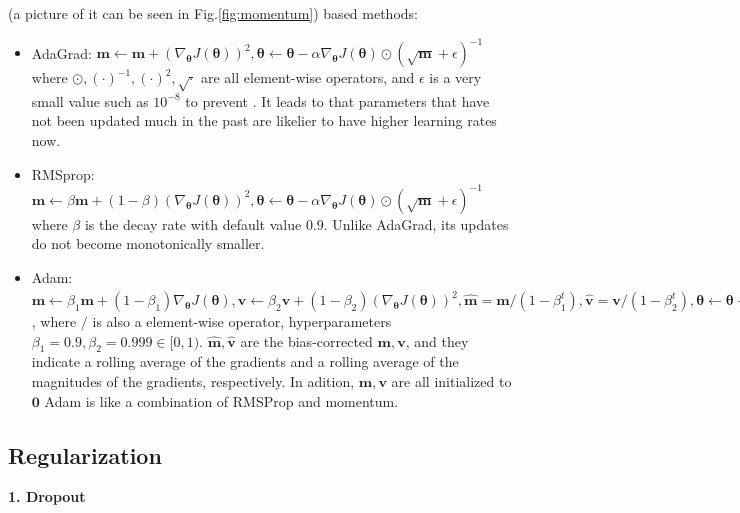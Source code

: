  (a picture of it can be seen in Fig.\ref{fig:momentum}) based methods:
\begin{itemize}
	\item AdaGrad: $\bm{m} \leftarrow \bm{m} + \left(\nabla_{\bm{\theta}} J (\bm{\theta})\right)^2, \bm{\theta} \leftarrow \bm{\theta} - \alpha \nabla_{\bm{\theta}} J (\bm{\theta}) \odot \left(\sqrt{\bm{m}} + \epsilon\right)^{-1}$ where $\odot, (\cdot)^{-1}, (\cdot)^{2}, \sqrt{\cdot}$ are all element-wise operators, and $\epsilon$ is a very small value such as $10^{-8}$ to prevent .
	It leads to that parameters that have not been updated much in the past are likelier to have higher learning rates now.
	\item RMSprop: $\bm{m} \leftarrow \beta \bm{m} + (1-\beta) \left(\nabla_{\bm{\theta}} J (\bm{\theta})\right)^2, \bm{\theta} \leftarrow \bm{\theta} - \alpha \nabla_{\bm{\theta}} J (\bm{\theta}) \odot \left(\sqrt{\bm{m}} + \epsilon\right)^{-1}$ where $\beta$ is the decay rate with default value $0.9$. Unlike AdaGrad, its updates do not become monotonically smaller.
	\item Adam: $\bm{m} \leftarrow \beta_1 \bm{m} + (1-\beta_1) \nabla_{\bm{\theta}} J (\bm{\theta}), \bm{v} \leftarrow \beta_2 \bm{v} + (1-\beta_2) \left(\nabla_{\bm{\theta}} J (\bm{\theta})\right)^2, \hat{\bm{m}} = \bm{m} / (1 - \beta_1^t), \hat{\bm{v}} = \bm{v} / (1 - \beta_2^t), \bm{\theta} \leftarrow \bm{\theta} - \alpha \hat{\bm{m}} /  \left(\sqrt{\hat{\bm{v}}} + \epsilon\right)^{-1}$, where $/$ is also a element-wise operator, hyperparameters $\beta_1 = 0.9, \beta_2 = 0.999 \in [0, 1)$. $\hat{\bm{m}}, \hat{\bm{v}}$ are the bias-corrected $\bm{m}, \bm{v}$, and they indicate a rolling average
	of the gradients and a rolling average of the magnitudes of the gradients, respectively. In adition, $\bm{m}, \bm{v}$ are all initialized to $\bm{0}$ Adam is like a combination of RMSProp and momentum.
\end{itemize}


\subsection{Regularization}
\textbf{1. Dropout}

